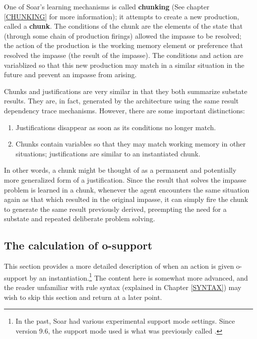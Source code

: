 One of Soar's learning mechanisms is called \textbf{chunking} (See chapter \ref{CHUNKING} for more information); it attempts to create a new production, called a \textbf{chunk}. The conditions of the chunk are the elements of the state that (through some chain of production firings) allowed the impasse to be resolved; the action of the production is the working memory element or preference that resolved the impasse (the result of the impasse). The conditions and action are variablized so that this new production may match in a similar situation in the future and prevent an impasse from arising.

Chunks and justifications are very similar in that they both summarize substate results. They are, in fact, generated by the architecture using the same result dependency trace mechanisms. However, there are some important distinctions:

\vspace{-12pt}
\begin{enumerate}
	\item Justifications disappear as soon as its conditions no longer match.
	\vspace{-8pt}
	\item Chunks contain variables so that they may match working memory in other situations; justifications are similar to an instantiated chunk.
\end{enumerate}

In other words, a chunk might be thought of as a permanent and potentially more generalized form of a justification. Since the result that solves the impasse problem is learned in a chunk, whenever the agent encounters the same situation again as that which resulted in the original impasse, it can simply fire the chunk to generate the same result previously derived, preempting the need for a substate and repeated deliberate problem solving.


\subsection{The calculation of o-support}
\label{SUPPORT}

This section provides a more detailed description of when an action is given o-support by an instantiation.\footnote{
	In the past, Soar had various experimental support mode settings. Since version 9.6, the support mode used is what was previously called .}
The content here is somewhat more advanced, and the reader unfamiliar with rule syntax (explained in Chapter \ref{SYNTAX}) may wish to skip this section and return at a later point.

